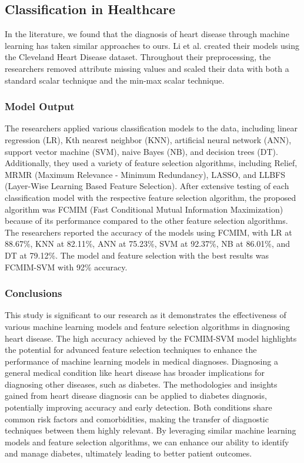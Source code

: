 \documentclass[conference]{IEEEtran}
\begin{document}
\subsection{Classification in Healthcare}
In the literature\cite{b2}, we found that the diagnosis of heart disease through machine learning has taken similar approaches to ours. Li et al. created their models using the Cleveland Heart Disease dataset. Throughout their preprocessing, the researchers removed attribute missing values and scaled their data with both a standard scalar technique and the min-max scalar technique.

\subsubsection{Model Output}
The researchers applied various classification models to the data, including linear regression (LR), Kth nearest neighbor (KNN), artificial neural network (ANN), support vector machine (SVM), naive Bayes (NB), and decision trees (DT). Additionally, they used a variety of feature selection algorithms, including Relief, MRMR (Maximum Relevance - Minimum Redundancy), LASSO, and LLBFS (Layer-Wise Learning Based Feature Selection). After extensive testing of each classification model with the respective feature selection algorithm, the proposed algorithm was FCMIM (Fast Conditional Mutual Information Maximization) because of its performance compared to the other feature selection algorithms. The researchers reported the accuracy of the models using FCMIM, with LR at 88.67\%, KNN at 82.11\%, ANN at 75.23\%, SVM at 92.37\%, NB at 86.01\%, and DT at 79.12\%. The model and feature selection with the best results was FCMIM-SVM with 92\% accuracy.

\subsubsection{Conclusions}
This study is significant to our research as it demonstrates the effectiveness of various machine learning models and feature selection algorithms in diagnosing heart disease. The high accuracy achieved by the FCMIM-SVM model highlights the potential for advanced feature selection techniques to enhance the performance of machine learning models in medical diagnoses. Diagnosing a general medical condition like heart disease has broader implications for diagnosing other diseases, such as diabetes. The methodologies and insights gained from heart disease diagnosis can be applied to diabetes diagnosis, potentially improving accuracy and early detection. Both conditions share common risk factors and comorbidities, making the transfer of diagnostic techniques between them highly relevant. By leveraging similar machine learning models and feature selection algorithms, we can enhance our ability to identify and manage diabetes, ultimately leading to better patient outcomes.
\end{document}
